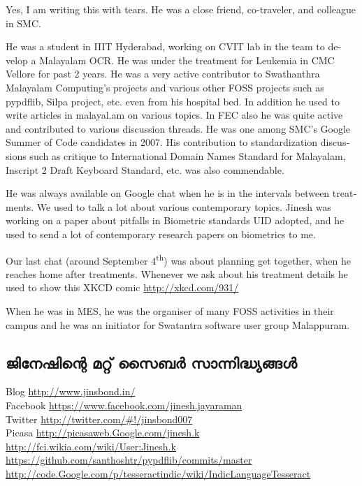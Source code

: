 \begin{english}
\enlargethispage*{3\baselineskip}
Yes, I am writing this with tears. He was a close friend,
co-traveler, and colleague in SMC.

He was a student in IIIT Hyderabad, working on CVIT lab in the team
to develop a Malayalam OCR. He was under the treatment for Leukemia in
CMC Vellore for past 2 years. He was a very active contributor to
Swathanthra Malayalam Computing's projects and various other FOSS
projects such as pypdflib, Silpa project, etc. even from his hospital
bed. In addition he used to write articles in malayal.am on various
topics. In FEC also he was quite active and contributed to various
discussion threads. He was one among SMC's  Google Summer of Code
candidates in 2007. His contribution to standardization discussions
such as critique to International Domain Names Standard for Malayalam,
Inscript 2 Draft Keyboard Standard, etc. was also commendable.

He was always available on Google chat when he is in the intervals
between treatments. We used to talk a lot about various contemporary
topics. Jinesh was working on a paper about pitfalls in Biometric
standards UID adopted, and he used to send a lot of contemporary
research papers on biometrics to me.

Our last chat (around September 4\textsuperscript{th}) was about planning get together, when
he reaches home after treatments.
Whenever we ask about his treatment details he used to show this XKCD comic
\url{http://xkcd.com/931/}

When he was in MES, he was the organiser of many FOSS activities in
their campus and he was an initiator for Swatantra software user group
Malappuram.
\end{english}

\subsection*{ജിനേഷിന്റെ മറ്റ് സൈബര്‍ സാന്നിദ്ധ്യങ്ങള്‍}
Blog \url{http://www.jinsbond.in/} \\
Facebook \url{https://www.facebook.com/jinesh.jayaraman} \\
Twitter \url{http://twitter.com/#!/jinsbond007} \\
Picasa \url{http://picasaweb.Google.com/jinesh.k} \\
\url{http://fci.wikia.com/wiki/User:Jinesh.k} \\
\url{https://github.com/santhoshtr/pypdflib/commits/master} \\
\url{http://code.Google.com/p/tesseractindic/wiki/IndicLanguageTesseract}
\newpage
